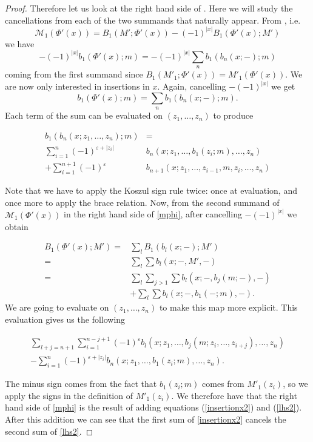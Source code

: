 \documentclass[Thesis.tex]{subfiles}
\begin{document}
\begin{proof}
Therefore let us look at the right hand side of . Here we will study the cancellations from each of the two summands that naturally appear. From , i.e. \[\mathcal{M}_1(\Phi'(x))=B_1(M';\Phi'(x))-(-1)^{|x|}B_1(\Phi'(x);M')\]  we have 
\[-(-1)^{|x|}b_1(\Phi'(x);m)=-(-1)^{|x|}\sum_n b_1(b_n(x;-);m)\] 
coming from the first summand since $B_1(M'_1;\Phi'(x))=M'_1(\Phi'(x))$. We are now only interested in insertions in $x$. Again, cancelling $-(-1)^{|x|}$ we get
\[b_1(\Phi'(x);m)=\sum_n b_1(b_n(x;-);m).\] 
Each term of the sum can be evaluated on $(z_1,\dots, z_n)$ to produce

\begin{align}\label{insertionx2}
b_1(b_n(x;z_1, \dots, z_n);m)&=\\
\sum_{i=1}^n (-1)^{\varepsilon+|z_i|}&b_n(x;z_1,\dots, b_1(z_i;m),\dots, z_n)\nonumber\\
+\sum_{i=1}^{n+1} (-1)^{\varepsilon}&b_{n+1}(x;z_1,\dots, z_{i-1},m,z_{i},\dots, z_n)\nonumber
\end{align}

Note that we have to apply the Koszul sign rule twice: once at evaluation, and once more to apply the brace relation. Now, from the second summand of $\mathcal{M}_1(\Phi'(x))$ in the right hand side of \cref{mphi}, after cancelling $-(-1)^{|x|}$ we obtain 


\begin{align*}
B_1(\Phi'(x);M')=&\sum_l B_1(b_l(x;-);M')\\
=&\sum_l\sum b_l(x;-,M',-) \\
=& \sum_l\sum_{j> 1}\sum b_l(x;-,b_j(m;-),-)\\
&+\sum_l\sum b_l(x;-,b_1(-;m),-).
\end{align*}
We are going to evaluate on $(z_1,\dots, z_n)$ to make this map more explicit. This evaluation gives us the following
 
 \begin{align}\label{lhs2}
 \sum_{l+j=n+1}\sum_{i=1}^{n-j+1}(-1)^{\varepsilon} b_l(x;z_1,\dots,b_j(m;z_{i},\dots, z_{i+j}),\dots, z_n)\\\nonumber -\sum_{i=1}^{n} (-1)^{\varepsilon+|z_i|}b_n(x;z_1,\dots,b_1(z_{i};m),\dots, z_n).
 \end{align}
 
 The minus sign comes from the fact that $b_1(z_i;m)$ comes from $M'_1(z_i)$, so we apply the signs in the definition of $M'_1(z_i)$. We therefore have that the right hand side of \cref{mphi} is the result of adding equations (\ref{insertionx2}) and (\ref{lhs2}). After this addition we can see that the first sum of \cref{insertionx2} cancels the second sum of \cref{lhs2}. 


\end{proof}
\end{document}
